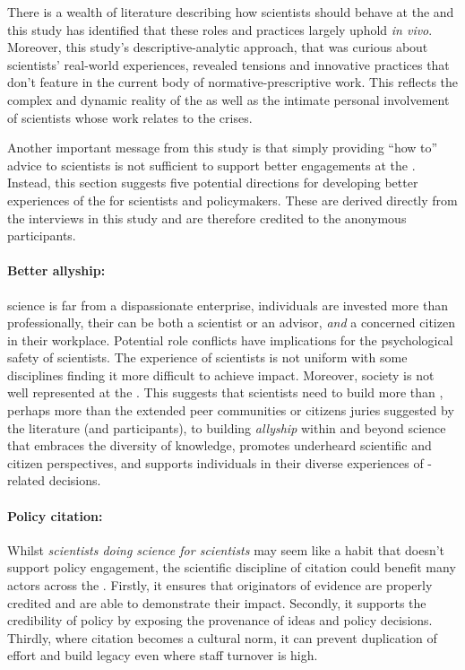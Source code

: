 There is a wealth of literature describing how scientists should behave at the \SPI{} and this study has identified that these roles and practices largely uphold \emph{in vivo}. Moreover, this study's descriptive-analytic approach, that was curious about scientists' real-world experiences, revealed tensions and innovative practices that don't feature in the current body of normative-prescriptive work. This reflects the complex and dynamic reality of the \SPI{} as well as the intimate personal involvement of scientists whose work relates to the \CAN{} crises. 

Another important message from this study is that simply providing ``how to'' advice to scientists is not sufficient to support better engagements at the \SPI. Instead, this section suggests five potential directions for developing better experiences of the \SPI{} for scientists and policymakers. These are derived directly from the interviews in this study and are therefore credited to the anonymous participants.

\paragraph{Better allyship:}
\CAN{} science is far from a dispassionate enterprise, individuals are invested more than professionally, their \skirole{} can be both a scientist or an advisor, \emph{and} a concerned citizen in their workplace. Potential role conflicts have implications for the psychological safety of scientists. The experience of scientists is not uniform with some disciplines finding it more difficult to achieve impact. Moreover, society is not well represented at the \SPI{}. This suggests that scientists need to build more than \skinetw{}, perhaps more than the extended peer communities or citizens juries suggested by the literature (and participants), to building \emph{allyship} within and beyond science that embraces the diversity of knowledge, promotes underheard scientific and citizen perspectives, and supports individuals in their diverse experiences of \CAN-related decisions.

\paragraph{Policy citation:}
Whilst \emph{scientists doing science for scientists} may seem like a habit that doesn't support policy engagement, the scientific discipline of citation could benefit many actors across the \SPI. Firstly, it ensures that originators of evidence are properly credited and are able to demonstrate their impact. Secondly, it supports the credibility of policy by exposing the provenance of ideas and policy decisions. Thirdly, where citation becomes a cultural norm, it can prevent duplication of effort and build legacy even where staff turnover is high.

